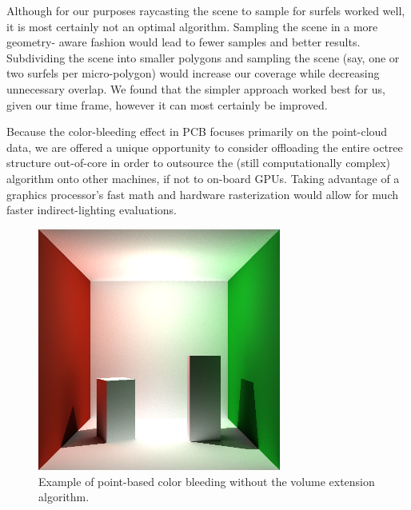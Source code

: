 \documentclass[12pt]{ucthesis}
\begin{document}
\vspace{5mm}

Although for our purposes raycasting the scene to sample for surfels worked well, it is most certainly not an optimal algorithm.  Sampling the scene in a more geometry- aware fashion would lead to fewer samples and better results.  Subdividing the scene into smaller polygons and sampling the scene (say, one or two surfels per micro-polygon) would increase our coverage while decreasing unnecessary overlap.  We found that the simpler approach worked best for us, given our time frame, however it can most certainly be improved.

\vspace{5mm}

Because the color-bleeding effect in PCB focuses primarily on the point-cloud data, we are offered a unique opportunity to consider offloading the entire octree structure out-of-core in order to outsource the (still computationally complex) algorithm onto other machines, if not to on-board GPUs.  Taking advantage of a graphics processor's fast math and hardware rasterization would allow for much faster indirect-lighting evaluations.


\clearpage







\begin{figure}[h!]
    \centering
    \includegraphics[width=80mm]{img/indirect_box_high.png}
    \caption{Example of point-based color bleeding without the volume extension algorithm.}
\end{figure}
\end{document}
